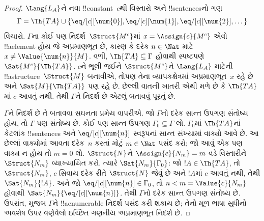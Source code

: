 \documentclass[../../../include/open-logic-section]{subfiles}
\begin{document}
\begin{proof}
$\Lang{L_A}$ને નવા !!{constant}~$c$થી વિસ્તારો અને !!{sentence}sનો ગણ
\[
\Gamma=\Th{TA}\cup\{\eq/[c][\num{0}],\eq/[c][\num{1}],
\eq/[c][\num{2}],\dots\}
\]
વિચારો. $\Gamma$ના કોઈ પણ નિદર્શ~$\Struct{M^c}$માં
$x=\Assign{c}{M^c}$ એવો !!a{element} હોય જે અપ્રમાણભૂત છે, કારણ કે
દરેક $n\in\Nat$ માટે $x\neq\Value{\num{n}}{M}$. વળી,
$\Th{TA}\subseteq\Gamma$ હોવાથી સ્પષ્ટપણે
$\Sat{M^c}{\Th{TA}}$. $c$ને ભૂલી જઈને $\Struct{M^c}$ને
$\Lang{L_A}$ માટેની !!a{structure}~$\Struct{M}$ બનાવીએ, તોપણ તેના
વ્યાપકક્ષેત્રમાં અપ્રમાણભૂત~$x$ રહે છે અને
$\Sat{M}{\Th{TA}}$ પણ રહે છે. છેલ્લી વાતની ખાતરી એથી મળે છે કે
$\Th{TA}$માં $c$ આવતું નથી. તેથી $\Gamma$ને નિદર્શ છે એટલું બતાવવું
પૂરતું છે.

$\Gamma$ને નિદર્શ છે તે બતાવવા સઘનતા પ્રમેય વાપરીએ. જો $\Gamma$નો
દરેક સાન્ત ઉપગણ સંતોષ્ય હોય, તો $\Gamma$ પણ સંતોષ્ય છે. કોઈ પણ સાન્ત
ઉપગણ $\Gamma_0\subseteq\Gamma$ લો. $\Gamma_0$માં $\Th{TA}$નાં કેટલાંક
!!{sentence}s અને $\eq/[c][\num{n}]$ સ્વરૂપનાં સાન્ત સંખ્યામાં વાક્યો
આવે છે. આ છેલ્લાં વાક્યોમાં આવતા દરેક~$n$ કરતાં મોટું $m\in\Nat$
પસંદ કરો; જો આવું એક પણ વાક્ય ન હોય તો $m=0$ લો. $\Struct{N}$ને
$\Assign{c}{N_m}=m$ વડે વિસ્તારીને $\Struct{N_m}$ વ્યાખ્યાયિત કરો.
ત્યારે $\Sat{N_m}{\Gamma_0}$: જો $!A\in\Th{TA}$, તો $\Struct{N_m}$,
$c$ સિવાય દરેક રીતે $\Struct{N}$ જેવું છે અને $!A$માં $c$ આવતું નથી,
તેથી $\Sat{N_m}{!A}$. અને જો
$\eq/[c][\num{n}]\in\Gamma_0$, તો $n<m=\Value{c}{N_m}$ હોવાથી
$\Sat{N_m}{\eq/[c][\num{n}]}$. તેથી $\Gamma$નો દરેક સાન્ત ઉપગણ
સંતોષ્ય છે. ઉપરાંત,  મુજબ $\Gamma$ને
!!a{enumerable} નિદર્શ પસંદ કરી શકાય છે; તેનો મૂળ ભાષા સુધીનો અવશેષ
ઉપર વર્ણવેલો ઇચ્છિત ગણનીય અપ્રમાણભૂત નિદર્શ છે.
\end{proof}
\end{document}
